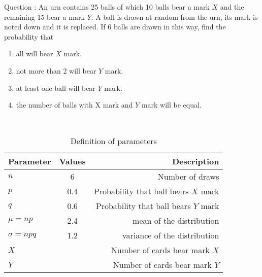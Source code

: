 \documentclass[journal,12pt,twocolumn]{IEEEtran}
\theoremstyle{remark}
\begin{document}
\let\vec\mathbf




\vspace{3cm}



\bigskip

\renewcommand{\thefigure}{\theenumi}
\renewcommand{\thetable}{\theenumi}
Question : An urn contains 25 balls of which 10 balls bear a mark $X$ and the remaining 15 bear a mark $Y$. A ball is drawn at random from the urn, its mark is noted down and it is replaced. If 6 balls are drawn in this way, find the probability that\\
\begin{enumerate}[label=(\alph*)]
\item all will bear $X$ mark.\\
\item not more than 2 will bear $Y$ mark.\\
\item at least one ball will bear $Y$ mark.\\
\item the number of balls with X mark and $Y$ mark will be equal.\\
\end{enumerate}
\solution  \\
\begin{table}[!ht]
\centering
\begin{tabular}{|l|c|r|}
    \hline
    Parameter & Values & Description\\
    \hline
    $n$ & 6 & Number of draws\\
    \hline
    $p$ & 0.4 & Probability that ball bears $X$ mark \\
    \hline
    $q$ & 0.6 & Probability that ball bears $Y$ mark \\
    \hline
    $\mu=np$ & 2.4 & mean of the distribution \\
    \hline
    $\sigma=npq $ & 1.2 & variance of the distribution\\
    \hline
    $X$ &  & Number of cards bear mark $X$ \\
    \hline
    $Y$ &  & Number of cards bear mark $Y$ \\
    \hline
\end{tabular}
\caption{Definition of parameters}
\label{tab:gaussian/9/3/17}
\end{table}
\end{document}
